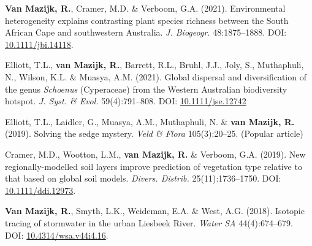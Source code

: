 \begin{hangparas}{2em}{1}

\textbf{Van Mazijk, R.}, Cramer, M.D. \& Verboom, G.A. (2021).
Environmental heterogeneity explains contrasting plant species richness between
the South African Cape and southwestern Australia. \textit{J. Biogeogr.}
48:1875--1888. DOI: \href{https://doi.org/10.1111/jbi.14118}{10.1111/jbi.14118}.

Elliott, T.L., \textbf{van Mazijk, R.}, Barrett, R.L., Bruhl, J.J., Joly, S.,
Muthaphuli, N., Wilson, K.L. \& Muasya, A.M. (2021). Global dispersal and
diversification of the genus \textit{Schoenus} (Cyperaceae) from the Western
Australian biodiversity hotspot. \textit{J. Syst. \& Evol.} 59(4):791--808. DOI:
\href{https://doi.org/10.1111/jse.1274}{10.1111/jse.12742}

Elliott, T.L., Laidler, G., Muasya, A.M., Muthaphuli, N. \& \textbf{van Mazijk,
R.} (2019). Solving the sedge mystery. \textit{Veld \& Flora} 105(3):20--25.
(Popular article)

Cramer, M.D., Wootton, L.M., \textbf{van Mazijk, R.} \& Verboom, G.A. (2019).
New regionally-modelled soil layers improve prediction of vegetation type
relative to that based on global soil models. \textit{Divers. Distrib.}
25(11):1736--1750. DOI:
\href{https://doi.org/10.1111/ddi.12973}{10.1111/ddi.12973}.

\textbf{Van Mazijk, R.}, Smyth, L.K., Weideman, E.A. \& West, A.G. (2018).
Isotopic tracing of stormwater in the urban Liesbeek River. \textit{Water SA}
44(4):674--679. DOI:
\href{https://doi.org/10.4314/wsa.v44i4.16}{10.4314/wsa.v44i4.16}.

\end{hangparas}
